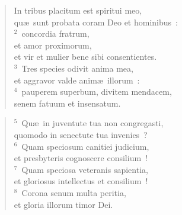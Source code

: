 \begin{flushleft}\begin{verse}\vspace{-19pt}\hspace{6pt}In tribus placitum est spiritui meo,\\\hspace{6pt} qu\ae\ sunt probata coram Deo et hominibus~:\\
${}^{2}$~concordia fratrum,\\ et amor proximorum,\\ et vir et mulier bene sibi consentientes.\\
${}^{3}$~Tres species odivit anima mea,\\ et aggravor valde anim\ae\ illorum~:\\
${}^{4}$~pauperem superbum, divitem mendacem,\\ senem fatuum et insensatum.\end{verse}\end{flushleft}


\begin{flushleft}\begin{verse}${}^{5}$~Qu\ae\ in juventute tua non congregasti,\\ quomodo in senectute tua invenies~?\\
${}^{6}$~Quam speciosum canitiei judicium,\\ et presbyteris cognoscere consilium~!\\
${}^{7}$~Quam speciosa veteranis sapientia,\\ et gloriosus intellectus et consilium~!\\
${}^{8}$~Corona senum multa peritia,\\ et gloria illorum timor Dei.\end{verse}\end{flushleft}


